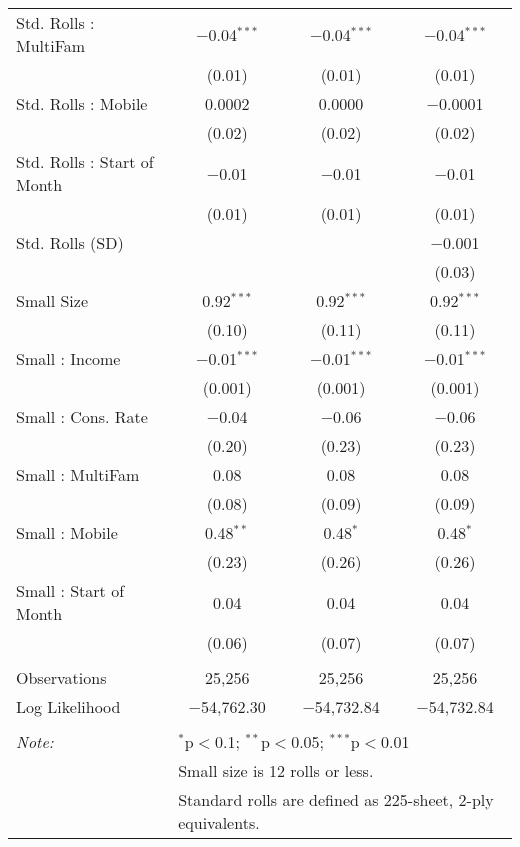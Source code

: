 \begin{table}[!htbp]
\begin{tabular}{@{\extracolsep{5pt}}lccc}
  Std. Rolls : MultiFam & $-$0.04$^{***}$ & $-$0.04$^{***}$ & $-$0.04$^{***}$ \\ 
  & (0.01) & (0.01) & (0.01) \\ 
  Std. Rolls : Mobile & 0.0002 & 0.0000 & $-$0.0001 \\ 
  & (0.02) & (0.02) & (0.02) \\ 
  Std. Rolls : Start of Month & $-$0.01 & $-$0.01 & $-$0.01 \\ 
  & (0.01) & (0.01) & (0.01) \\ 
  Std. Rolls (SD) &  &  & $-$0.001 \\ 
  &  &  & (0.03) \\ 
  Small Size & 0.92$^{***}$ & 0.92$^{***}$ & 0.92$^{***}$ \\ 
  & (0.10) & (0.11) & (0.11) \\ 
  Small : Income & $-$0.01$^{***}$ & $-$0.01$^{***}$ & $-$0.01$^{***}$ \\ 
  & (0.001) & (0.001) & (0.001) \\ 
  Small : Cons. Rate & $-$0.04 & $-$0.06 & $-$0.06 \\ 
  & (0.20) & (0.23) & (0.23) \\ 
  Small : MultiFam & 0.08 & 0.08 & 0.08 \\ 
  & (0.08) & (0.09) & (0.09) \\ 
  Small : Mobile & 0.48$^{**}$ & 0.48$^{*}$ & 0.48$^{*}$ \\ 
  & (0.23) & (0.26) & (0.26) \\ 
  Small : Start of Month & 0.04 & 0.04 & 0.04 \\ 
  & (0.06) & (0.07) & (0.07) \\ 
 \hline \\[-1.8ex] 
Observations & 25,256 & 25,256 & 25,256 \\ 
Log Likelihood & $-$54,762.30 & $-$54,732.84 & $-$54,732.84 \\ 
\hline 
\hline \\[-1.8ex] 
\textit{Note:}  & \multicolumn{3}{l}{$^{*}$p$<$0.1; $^{**}$p$<$0.05; $^{***}$p$<$0.01} \\ 
 & \multicolumn{3}{l}{Small size is 12 rolls or less.} \\ 
 & \multicolumn{3}{l}{Standard rolls are defined as 225-sheet, 2-ply equivalents.} \\ 
\end{tabular} 
\end{table} 
